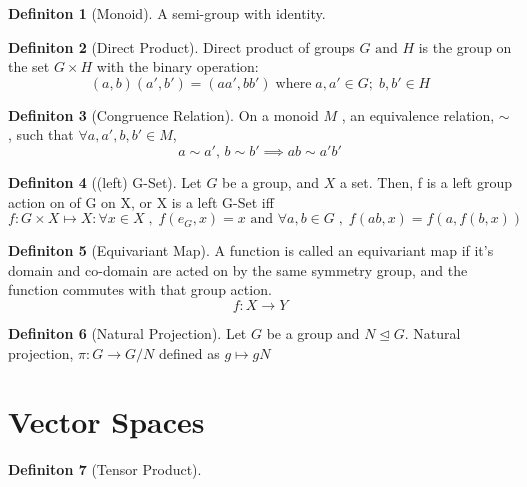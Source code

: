 \documentclass{article}
\theoremstyle{definition}
\theoremstyle{definition}
\newtheorem{definition}{Definiton}[section]
\begin{document}
\begin{definition}[Monoid] %
	A semi-group with identity.
\end{definition}

\begin{definition}[Direct Product] %
	Direct product of groups $ G \text{ and } H $ is the group on the set $ G \times H $ with the binary operation:
\[ (a,b)(a',b')=(aa',bb') \; \text{where} \; a,a' \in G; \; b,b' \in H\]
\end{definition}

\begin{definition}[Congruence Relation] %
On a monoid $ M $ , an equivalence relation, $ \sim $ , such that $ \forall a,a',b,b' \in M $,
\[ a \sim a' ,\, b\sim b' \implies ab \sim a'b'  \]
\end{definition}

\begin{definition}[(left) G-Set] %
Let $ G $ be a group, and $ X $ a set. Then, f is a left group action on of G on X, or X is a left G-Set iff
\[ f:G \times X \mapsto X : \forall x \in X \; , \;   f(e_G,x)=x \text{ and } \forall a,b \in G \; , \; f(ab,x)=f(a, f(b,x))  \]
\end{definition}

\begin{definition}[Equivariant Map] %
A function is called an equivariant map if it's domain and co-domain are acted on by the same symmetry group, and the function commutes with that group action.
\[ f:X \to Y  \]
\end{definition}
\begin{definition}[Natural Projection] %
Let $G$ be a group and $N \trianglelefteq G$. Natural projection, $\pi : G \rightarrow G/N$ defined as $g \mapsto gN$
\end{definition}

\section{Vector Spaces}

\begin{definition}[Tensor Product] %

\end{definition}
\end{document}
